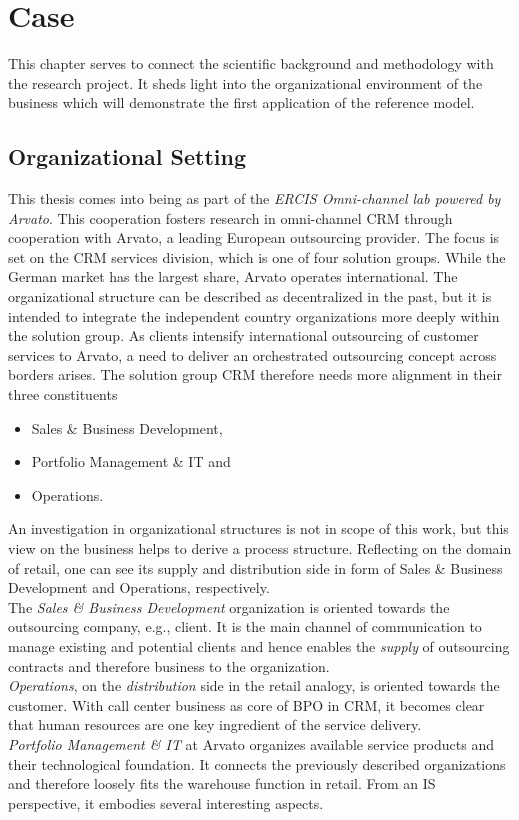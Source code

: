\chapter{Case}
\label{chap:case}
This chapter serves to connect the scientific background and methodology with the research project. 
It sheds light into the organizational environment of the business which will demonstrate the first application of the reference model. 

\section{Organizational Setting}
This thesis comes into being as part of the \textit{ERCIS Omni-channel lab powered by Arvato}. This cooperation fosters research in omni-channel CRM through cooperation with Arvato, a leading European outsourcing provider. The focus is set on the CRM services division, which is one of four 
solution groups. While the German market has the largest share, Arvato operates international. The organizational structure can be described as decentralized in the past, but it is intended to integrate the independent country organizations more deeply within the solution group. As clients intensify international outsourcing of customer services to Arvato, a need to deliver an orchestrated outsourcing concept across borders arises. The solution group CRM therefore needs more alignment in their three constituents

\begin{itemize}
	\item Sales \& Business Development,
	\item Portfolio Management \& IT and
	\item Operations.
\end{itemize}

An investigation in organizational structures is not in scope of this work, but this view on the business helps to derive a process structure. Reflecting on the domain of retail, one can see its supply and distribution side in form of Sales \& Business Development and Operations, respectively. \\
The \textit{Sales \& Business Development} organization is oriented towards the outsourcing company, e.g., client. It is the main channel of communication to manage existing and potential clients and hence enables the \textit{supply} of outsourcing contracts and therefore business to the organization.\\
 \textit{Operations}, on the \textit{distribution} side in the retail analogy, is oriented towards the customer. With call center business as core of BPO in CRM, it becomes clear that human resources are one key ingredient of the service delivery.  \\
 \textit{Portfolio Management \& IT} at Arvato organizes available service products and their technological foundation. It connects the previously described organizations and therefore loosely fits the warehouse function in retail. From an \acrshort{IS} perspective, it embodies several interesting aspects.
 
